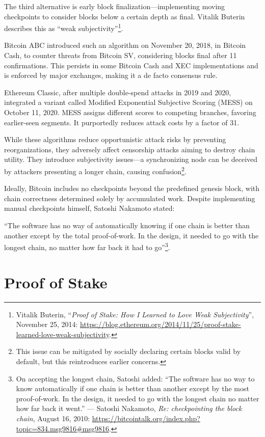 \documentclass[
  a5paper,
  smalldemyvopaper,10pt,twoside,onecolumn,openright,extrafontsizes,hidelinks]{memoir}
\begin{document}
The third alternative is early block finalization---implementing moving
checkpoints to consider blocks below a certain depth as final. Vitalik
Buterin describes this as ``weak subjectivity''\footnote{Vitalik
  Buterin, ``\emph{Proof of Stake: How I Learned to Love Weak
  Subjectivity}'', November 25, 2014:
  \url{https://blog.ethereum.org/2014/11/25/proof-stake-learned-love-weak-subjectivity}.}.

Bitcoin ABC introduced such an algorithm on November 20, 2018, in
Bitcoin Cash, to counter threats from Bitcoin SV, considering blocks
final after 11 confirmations. This persists in some Bitcoin Cash and XEC
implementations and is enforced by major exchanges, making it a de facto
consensus rule.

Ethereum Classic, after multiple double-spend attacks in 2019 and 2020,
integrated a variant called Modified Exponential Subjective Scoring
(MESS) on October 11, 2020. MESS assigns different scores to competing
branches, favoring earlier-seen segments. It purportedly reduces attack
costs by a factor of 31.

While these algorithms reduce opportunistic attack risks by preventing
reorganizations, they adversely affect censorship attacks aiming to
destroy chain utility. They introduce subjectivity issues---a
synchronizing node can be deceived by attackers presenting a longer
chain, causing confusion\footnote{This issue can be mitigated by
  socially declaring certain blocks valid by default, but this
  reintroduces earlier concerns.}.

Ideally, Bitcoin includes no checkpoints beyond the predefined genesis
block, with chain correctness determined solely by accumulated work.
Despite implementing manual checkpoints himself, Satoshi Nakamoto
stated:

``The software has no way of automatically knowing if one chain is
better than another except by the total proof-of-work. In the design, it
needed to go with the longest chain, no matter how far back it had to
go''\footnote{On accepting the longest chain, Satoshi added: ``The
  software has no way to know automatically if one chain is better than
  another except by the most proof-of-work. In the design, it needed to
  go with the longest chain no matter how far back it went.'' ---
  Satoshi Nakamoto, \emph{Re: checkpointing the block chain}, August 16,
  2010:
  \url{https://bitcointalk.org/index.php?topic=834.msg9816\#msg9816}.}.

\section*{Proof of Stake}\label{la-preuve-denjeu}
\end{document}
